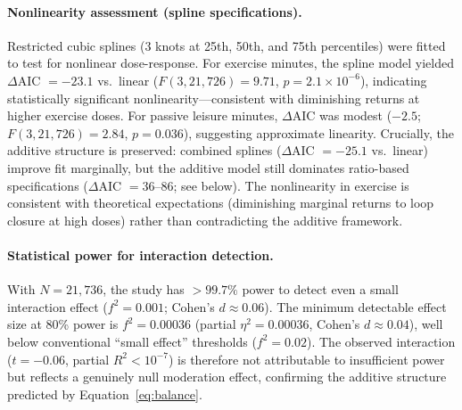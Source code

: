 \documentclass[a4paper,11pt,titlepage]{article}
\begin{document}
\paragraph{Nonlinearity assessment (spline specifications).}
Restricted cubic splines (3 knots at 25th, 50th, and 75th percentiles) were fitted to test for nonlinear dose-response. For exercise minutes, the spline model yielded $\Delta$AIC $= -23.1$ vs.\ linear ($F(3, 21{,}726) = 9.71$, $p = 2.1 \times 10^{-6}$), indicating statistically significant nonlinearity---consistent with diminishing returns at higher exercise doses. For passive leisure minutes, $\Delta$AIC was modest ($-2.5$; $F(3, 21{,}726) = 2.84$, $p = 0.036$), suggesting approximate linearity. Crucially, the additive structure is preserved: combined splines ($\Delta$AIC $= -25.1$ vs.\ linear) improve fit marginally, but the additive model still dominates ratio-based specifications ($\Delta$AIC $= 36$--$86$; see below). The nonlinearity in exercise is consistent with theoretical expectations (diminishing marginal returns to loop closure at high doses) rather than contradicting the additive framework.

\paragraph{Statistical power for interaction detection.}
With $N = 21{,}736$, the study has $> 99.7\%$ power to detect even a small interaction effect ($f^2 = 0.001$; Cohen's $d \approx 0.06$). The minimum detectable effect size at 80\% power is $f^2 = 0.00036$ (partial $\eta^2 = 0.00036$, Cohen's $d \approx 0.04$), well below conventional ``small effect'' thresholds ($f^2 = 0.02$). The observed interaction ($t = -0.06$, partial $R^2 < 10^{-7}$) is therefore not attributable to insufficient power but reflects a genuinely null moderation effect, confirming the additive structure predicted by Equation~\ref{eq:balance}.
\end{document}
